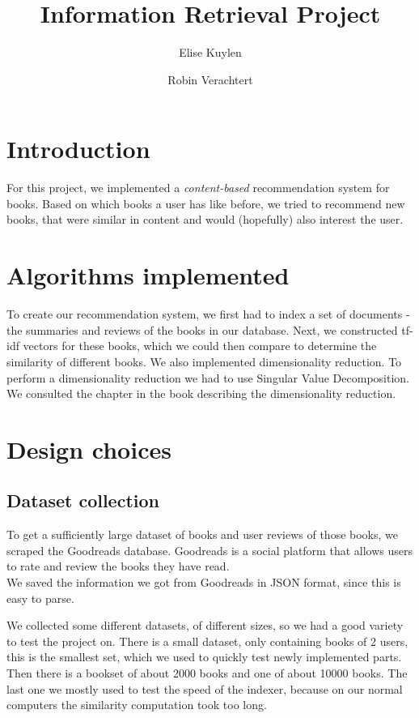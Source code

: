 \documentclass[10pt,a4paper]{paper}
\author{Elise Kuylen \and Robin Verachtert}
\title{Information Retrieval Project}
\begin{document}
\maketitle

\section{Introduction}

For this project, we implemented a \textit{content-based} recommendation system for books. Based on which books a user has like before, we tried to recommend new books, that were similar in content and would (hopefully) also interest the user.

\section{Algorithms implemented}

To create our recommendation system, we first had to index a set of documents - the summaries and reviews of the books in our database. Next, we constructed tf-idf vectors for these books, which we could then compare to determine the similarity of different books. We also implemented dimensionality reduction. To perform a dimensionality reduction we had to use Singular Value Decomposition. We consulted the chapter in the book describing the dimensionality reduction.  

\section{Design choices}

\subsection{Dataset collection}

To get a sufficiently large dataset of books and user reviews of those books, we scraped the Goodreads database. Goodreads is a social platform that allows users to rate and review the books they have read. \\
We saved the information we got from Goodreads in JSON format, since this is easy to parse.

We collected some different datasets, of different sizes, so we had a good variety to test the project on. There is a small dataset, only containing books of 2 users, this is the smallest set, which we used to quickly test newly implemented parts. Then there is a bookset of about 2000 books and one of about 10000 books. The last one we mostly used to test the speed of the indexer, because on our normal computers the similarity computation took too long.
\end{document}
